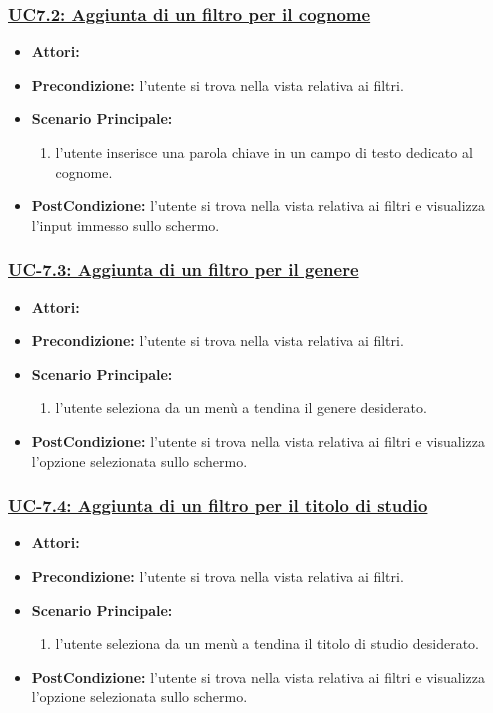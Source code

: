 \subsubsection{\underline{UC7.2: Aggiunta di un filtro per il cognome}}
\begin{itemize}
	\item \textbf{Attori:}\loggedusr
	\item \textbf{Precondizione:} l'utente si trova nella vista relativa ai filtri.
	\item \textbf{Scenario Principale:}
	\begin{enumerate}
		\item l'utente inserisce una parola chiave in un campo di testo dedicato al cognome.
	\end{enumerate}
	\item \textbf{PostCondizione:}  l'utente si trova nella vista relativa ai filtri e visualizza l'input immesso sullo schermo.
\end{itemize}

\subsubsection{\underline{UC-7.3: Aggiunta di un filtro per il genere}}
\begin{itemize}
	\item \textbf{Attori:}\loggedusr
	\item \textbf{Precondizione:} l'utente si trova nella vista relativa ai filtri.
	\item \textbf{Scenario Principale:}
	\begin{enumerate}
		\item l'utente seleziona da un menù a tendina il genere desiderato.
	\end{enumerate}
	\item \textbf{PostCondizione:}  l'utente si trova nella vista relativa ai filtri e visualizza l'opzione selezionata sullo schermo.
\end{itemize}

\subsubsection{\underline{UC-7.4: Aggiunta di un filtro per il titolo di studio}}
\begin{itemize}
	\item \textbf{Attori:}\loggedusr
	\item \textbf{Precondizione:} l'utente si trova nella vista relativa ai filtri.
	\item \textbf{Scenario Principale:}
	\begin{enumerate}
		\item l'utente seleziona da un menù a tendina il titolo di studio desiderato.
	\end{enumerate}
	\item \textbf{PostCondizione:}  l'utente si trova nella vista relativa ai filtri e visualizza l'opzione selezionata sullo schermo.
\end{itemize}
